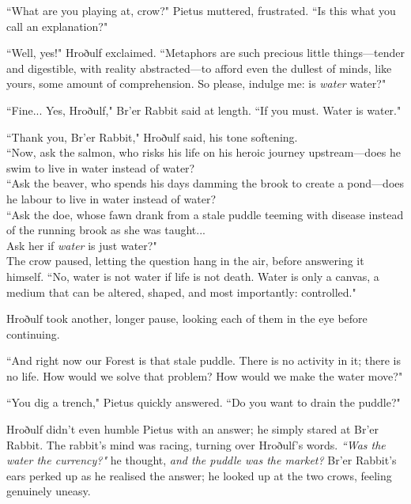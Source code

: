 ``What are you playing at, crow?" Pietus muttered, frustrated.
``Is this what you call an explanation?"

``Well, yes!" Hroðulf exclaimed.
``Metaphors are such precious little things---tender and digestible, with reality abstracted---to afford even the dullest of minds, like yours, some amount of comprehension.
So please, indulge me: is \textit{water} water?"

``Fine... Yes, Hroðulf," Br'er Rabbit said at length.
``If you must.
Water is water."

``Thank you, Br'er Rabbit," Hroðulf said, his tone softening.\\

``Now, ask the salmon, who risks his life on his heroic journey upstream---does he swim to live in water instead of water?\\

``Ask the beaver, who spends his days damming the brook to create a pond---does he labour to live in water instead of water?\\

``Ask the doe, whose fawn drank from a stale puddle teeming with disease instead of the running brook as she was taught...\\
Ask her if \textit{water} is just water?"\\

The crow paused, letting the question hang in the air, before answering it himself.
``No, water is not water if life is not death.
Water is only a canvas, a medium that can be altered, shaped, and most importantly: controlled."

Hroðulf took another, longer pause, looking each of them in the eye before continuing.

``And right now our Forest is that stale puddle.
There is no activity in it; there is no life.
How would we solve that problem?
How would we make the water move?"


``You dig a trench," Pietus quickly answered. ``Do you want to drain the puddle?"

Hroðulf didn't even humble Pietus with an answer; he simply stared at Br'er Rabbit.
The rabbit's mind was racing, turning over Hroðulf's words. \textit{``Was the water the currency?"} he thought, \textit{and the puddle was the market?}
Br'er Rabbit's ears perked up as he realised the answer; he looked up at the two crows, feeling genuinely uneasy.

